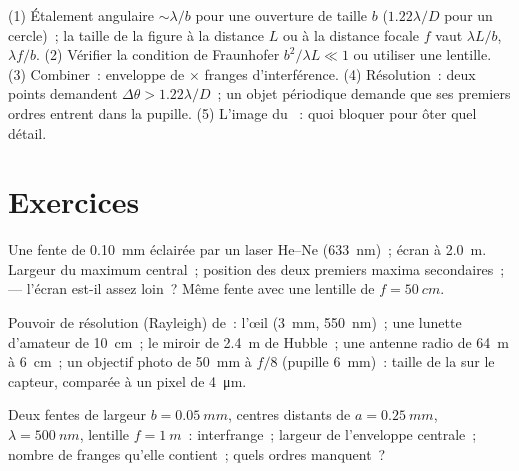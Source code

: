 \begin{method}\label{met:b2:diffraction:method}
(1) Étalement angulaire $\sim\lambda/b$ pour une ouverture de taille $b$ ($1.22\lambda/D$ pour
un cercle)~; la taille de la figure à la distance $L$ ou à la distance focale $f$ vaut
$\lambda L/b$, $\lambda f/b$. (2) Vérifier la condition de Fraunhofer $b^2/\lambda L \ll 1$ ou
utiliser une lentille. (3) Combiner~: enveloppe de  $\times$ franges
d'interférence. (4) Résolution~: deux points demandent $\Delta\theta > 1.22\lambda/D$~; un objet
périodique demande que ses premiers ordres entrent dans la pupille. (5) L'image du ~: quoi bloquer pour ôter quel détail.
\end{method}

\section{Exercices}

\begin{exercise}[$\star$]\label{exo:b2:diffraction:1}
Une fente de \qty{0.10}{mm} éclairée par un laser He--Ne (\qty{633}{nm})~; écran à
\qty{2.0}{m}. Largeur du maximum central~; position des deux premiers
maxima secondaires~;  --- l'écran est-il assez loin~? Même
fente avec une lentille de $f = \qty{50}{cm}$.
\end{exercise}

\begin{exercise}[$\star$]\label{exo:b2:diffraction:2}
Pouvoir de résolution (Rayleigh) de~: l'œil (\qty{3}{mm}, \qty{550}{nm})~; une
lunette d'amateur de \qty{10}{cm}~; le miroir de \qty{2.4}{m} de Hubble~; une antenne
radio de \qty{64}{m} à \qty{6}{cm}~; un objectif photo de \qty{50}{mm} à $f/8$ (pupille \qty{6}{mm})~:
taille de la  sur le capteur, comparée à un pixel de \qty{4}{\micro m}.
\end{exercise}

\begin{exercise}[$\star$]\label{exo:b2:diffraction:3}
Deux fentes de largeur $b = \qty{0.05}{mm}$, centres distants de $a = \qty{0.25}{mm}$, $\lambda =
\qty{500}{nm}$, lentille $f = \qty{1}{m}$~: interfrange~; largeur de l'enveloppe
centrale~; nombre de franges qu'elle contient~; quels ordres manquent~?
\end{exercise}

